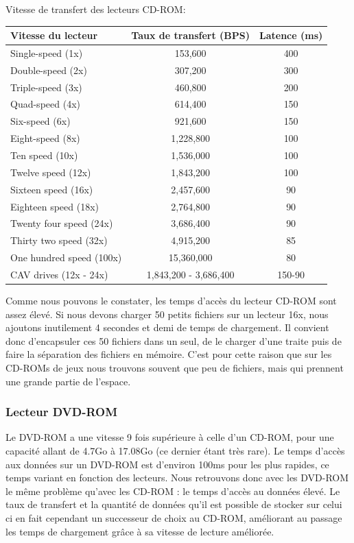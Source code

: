\documentclass[a4paper, 12pt]{article} %
\begin{document}
\newpage
Vitesse de transfert des lecteurs CD-ROM: \cite{hardware:cdromspeed}

\begin{tabular}{|l|c|c|}
  \hline
  Vitesse du lecteur & Taux de transfert (BPS) & Latence (ms)\\
  \hline
  Single-speed (1x)&153,600&400\\
	Double-speed (2x)&307,200&300\\
	Triple-speed (3x)&460,800&200\\
	Quad-speed (4x)&614,400&150\\
	Six-speed (6x)&921,600&150\\
	Eight-speed (8x)&1,228,800&100\\
	Ten speed (10x)&1,536,000&100\\
	Twelve speed (12x)&1,843,200&100\\
	Sixteen speed (16x)&2,457,600&90\\
	Eighteen speed (18x)&2,764,800&90\\
	Twenty four speed (24x)&3,686,400&90\\
	Thirty two speed (32x)&4,915,200&85\\
	One hundred speed (100x)&15,360,000&80\\
	CAV drives (12x - 24x)&1,843,200 - 3,686,400&150-90\\
  \hline
\end{tabular}

Comme nous pouvons le constater, les temps d'accès du lecteur CD-ROM sont assez élevé. Si nous devons charger 50 petits fichiers sur un lecteur 16x, nous ajoutons inutilement 4 secondes et demi de temps de chargement. Il convient donc d'encapsuler ces 50 fichiers dans un seul, de le charger d'une traite puis de faire la séparation des fichiers en mémoire.
C'est pour cette raison que sur les CD-ROMs de jeux nous trouvons souvent que peu de fichiers, mais qui prennent une grande partie de l'espace.

\subsubsection{Lecteur DVD-ROM}
Le DVD-ROM a une vitesse 9 fois supérieure à celle d'un CD-ROM,\cite{hardware:dvdromspeed} pour une capacité allant de 4.7Go à 17.08Go (ce dernier étant très rare). Le temps d'accès aux données sur un DVD-ROM est d'environ 100ms pour les plus rapides, ce temps variant en fonction des lecteurs. Nous retrouvons donc avec les DVD-ROM le même problème qu'avec les CD-ROM : le temps d'accès au données élevé. Le taux de transfert et la quantité de données qu'il est possible de stocker sur celui ci en fait cependant un successeur de choix au CD-ROM, améliorant au passage les temps de chargement grâce à sa vitesse de lecture améliorée.
\end{document}
